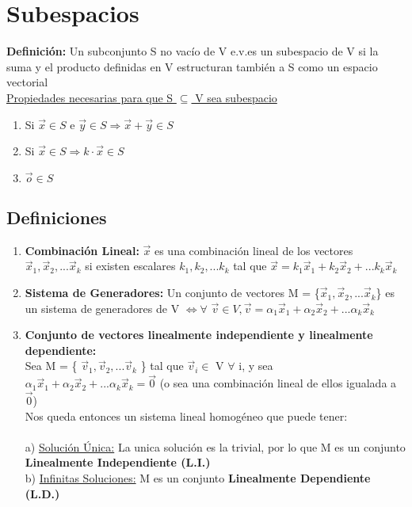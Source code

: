 \documentclass{article}
\begin{document}
\section{Subespacios} 
{\bfseries Definición:} Un subconjunto S no vacío de V e.v.es un subespacio de V si la suma y el producto definidas en  V estructuran también a S como un espacio vectorial \\
\underline {Propiedades necesarias para que S $\subseteq$ V sea subespacio}
\begin{enumerate}
\item Si $\vec{x} \in S$ e $\vec{y} \in S \Rightarrow \vec{x} + \vec{y} \in S$
\item Si $\vec{x} \in S \Rightarrow k \cdot \vec{x} \in S$
\item $\vec{o} \in S$
\end{enumerate}
\subsection{Definiciones}
\begin{enumerate}
\item {\bfseries Combinación Lineal:} $\vec{x}$ es una combinación lineal de los vectores $\vec{x}_{1}, \vec{x}_2,... \vec{x}_k $ si existen escalares $k_{1}, k_{2},... k_{k} $ tal que $\vec{x} = k_{1}\vec{x}_{1} + k_{2}\vec{x}_{2} +... k_{k}\vec{x}_{k}$
\item {\bfseries Sistema de Generadores:} Un conjunto de vectores M = \{$\vec{x}_{1}, \vec{x}_2,... \vec{x}_k $\} es un sistema de generadores de V $\Leftrightarrow \forall $ $ \vec{v} \in V, \vec{v} = \alpha_{1}\vec{x}_{1} + \alpha_{2}\vec{x}_{2} +... \alpha_{k}\vec{x}_{k}$
\item {\bfseries Conjunto de vectores linealmente independiente y linealmente dependiente:}\\
Sea M = \{ $\vec{v}_{1}, \vec{v}_2,... \vec{v}_k $ \} tal que $\vec{v}_{i} \in$ V $\forall $ i, y sea $\alpha_{1}\vec{x}_{1} + \alpha_{2}\vec{x}_{2} +... \alpha_{k}\vec{x}_{k} = \vec{0}$ (o sea una combinación lineal de ellos igualada a $\vec{0}$)\\
Nos queda entonces un sistema lineal homogéneo que puede tener:\\\\
a) \underline{Solución Única:} La unica solución es la trivial, por lo que M es un conjunto {\bfseries Linealmente Independiente (L.I.)}\\
b) \underline{Infinitas Soluciones:} M es un conjunto {\bfseries Linealmente Dependiente (L.D.)}
\end{enumerate}
\newpage
\end{document}
